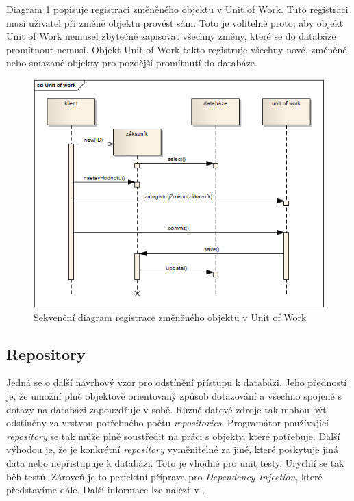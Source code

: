 \documentclass[11pt,twoside,a4paper]{book}
\begin{document}
Diagram \ref{fig:uow} popisuje registraci změněného objektu v Unit of Work. Tuto registraci musí uživatel při změně objektu provést sám. Toto je volitelné proto, aby objekt Unit of Work nemusel zbytečně zapisovat všechny změny, které se do databáze promítnout nemusí. Objekt Unit of Work takto registruje všechny nové, změněné nebo smazané objekty pro pozdější promítnutí do databáze.
\begin{figure}[h!]
\begin{center}
\includegraphics[scale=0.7]{figures/uow}
\caption{Sekvenční diagram registrace změněného objektu v Unit of Work}
\label{fig:uow}
\end{center}
\end{figure}


\subsection{Repository}

Jedná se o další návrhový vzor pro odstínění přístupu k databázi. Jeho předností je, že umožní plně objektově orientovaný způsob dotazování a všechno spojené s dotazy na databázi zapouzdřuje v sobě. Různé datové zdroje tak mohou být odstíněny za vrstvou potřebného počtu \textit{repositories}. Programátor používající \textit{repository} se tak může plně soustředit na práci s objekty, které potřebuje. Další výhodou je, že je konkrétní \textit{repository} vyměnitelné za jiné, které poskytuje jiná data nebo nepřistupuje k databázi. Toto je vhodné pro unit testy. Urychlí se tak běh testů. Zároveň je to perfektní příprava pro \textit{Dependency Injection}, které představíme dále. Další informace lze nalézt v \citep{PEAA}.
\end{document}

